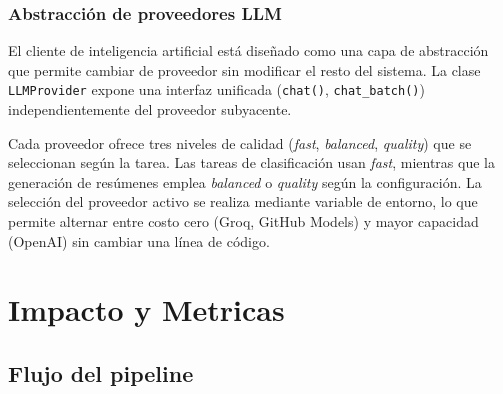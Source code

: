 \documentclass[12pt,oneside]{report}
\begin{document}
\subsection{Abstracci\'on de proveedores LLM}

El cliente de inteligencia artificial est\'a dise\~nado como una capa de abstracci\'on que permite cambiar de proveedor sin modificar el resto del sistema. La clase \texttt{LLMProvider} expone una interfaz unificada (\texttt{chat()}, \texttt{chat\_batch()}) independientemente del proveedor subyacente.

\begin{table}[H]
\centering
{}
\caption{Modelos disponibles por proveedor y nivel de calidad}
\end{table}

Cada proveedor ofrece tres niveles de calidad (\textit{fast}, \textit{balanced}, \textit{quality}) que se seleccionan seg\'un la tarea. Las tareas de clasificaci\'on usan \textit{fast}, mientras que la generaci\'on de res\'umenes emplea \textit{balanced} o \textit{quality} seg\'un la configuraci\'on. La selecci\'on del proveedor activo se realiza mediante variable de entorno, lo que permite alternar entre costo cero (Groq, GitHub Models) y mayor capacidad (OpenAI) sin cambiar una l\'inea de c\'odigo.



\chapter{Impacto y Metricas}

\section{Flujo del pipeline}
\end{document}
